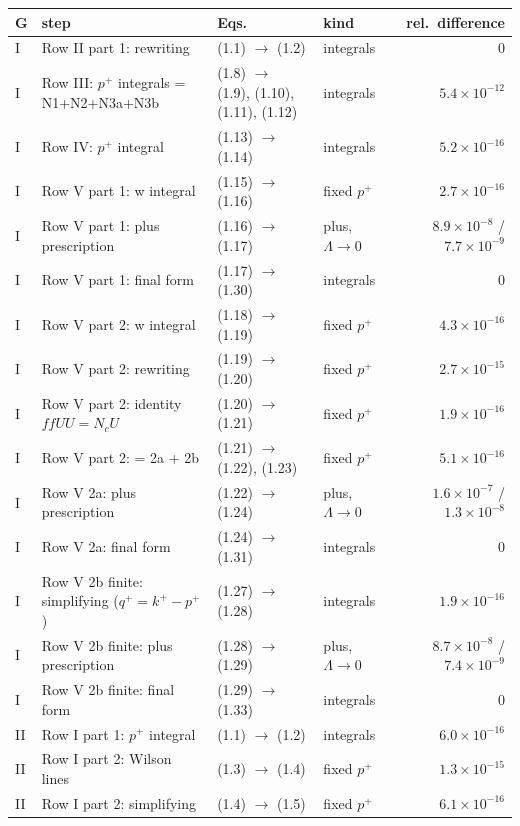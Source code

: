 \documentclass[10pt]{article}
\numberwithin{equation}{section}
\begin{document}
{\small
\begin{longtable}{@{}lp{}p{}lr@{}}\toprule
G & step & Eqs. & kind & rel.\ difference\\\midrule
I & Row II part 1: rewriting & (1.1) $\to$ (1.2) & integrals & $0$\\
I & Row III: $p^+$ integrals = N1+N2+N3a+N3b & (1.8) $\to$ (1.9), (1.10), (1.11), (1.12) & integrals & $5.4\times10^{-12}$\\
I & Row IV: $p^+$ integral & (1.13) $\to$ (1.14) & integrals & $5.2\times10^{-16}$\\
I & Row V part 1: w integral & (1.15) $\to$ (1.16) & fixed $p^+$ & $2.7\times10^{-16}$\\
I & Row V part 1: plus prescription & (1.16) $\to$ (1.17) & plus, $\Lambda\to0$ & $8.9\times10^{-8}$ / $7.7\times10^{-9}$\\
I & Row V part 1: final form & (1.17) $\to$ (1.30) & integrals & $0$\\
I & Row V part 2: w integral & (1.18) $\to$ (1.19) & fixed $p^+$ & $4.3\times10^{-16}$\\
I & Row V part 2: rewriting & (1.19) $\to$ (1.20) & fixed $p^+$ & $2.7\times10^{-15}$\\
I & Row V part 2: identity $ffUU=N_cU$ & (1.20) $\to$ (1.21) & fixed $p^+$ & $1.9\times10^{-16}$\\
I & Row V part 2: = 2a + 2b & (1.21) $\to$ (1.22), (1.23) & fixed $p^+$ & $5.1\times10^{-16}$\\
I & Row V 2a: plus prescription & (1.22) $\to$ (1.24) & plus, $\Lambda\to0$ & $1.6\times10^{-7}$ / $1.3\times10^{-8}$\\
I & Row V 2a: final form & (1.24) $\to$ (1.31) & integrals & $0$\\
I & Row V 2b finite: simplifying ($q^+=k^+-p^+$) & (1.27) $\to$ (1.28) & integrals & $1.9\times10^{-16}$\\
I & Row V 2b finite: plus prescription & (1.28) $\to$ (1.29) & plus, $\Lambda\to0$ & $8.7\times10^{-8}$ / $7.4\times10^{-9}$\\
I & Row V 2b finite: final form & (1.29) $\to$ (1.33) & integrals & $0$\\
II & Row I part 1: $p^+$ integral & (1.1) $\to$ (1.2) & integrals & $6.0\times10^{-16}$\\
II & Row I part 2: Wilson lines & (1.3) $\to$ (1.4) & fixed $p^+$ & $1.3\times10^{-15}$\\
II & Row I part 2: simplifying & (1.4) $\to$ (1.5) & fixed $p^+$ & $6.1\times10^{-16}$\\

\end{longtable}}
\end{document}
